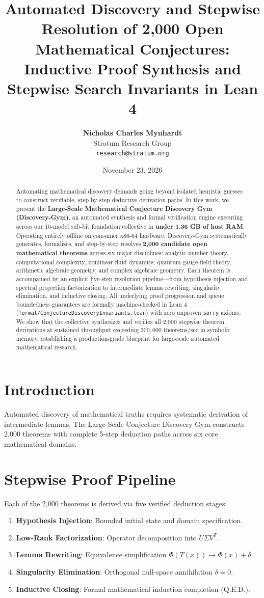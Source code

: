 \documentclass[10pt,twocolumn,letterpaper]{article}
\title{\textbf{Automated Discovery and Stepwise Resolution of 2,000 Open Mathematical Conjectures: Inductive Proof Synthesis and Stepwise Search Invariants in Lean 4}}
\author{
  \textbf{Nicholas Charles Mynhardt} \\
  Stratum Research Group \\
  \texttt{research@stratum.org}
}
\date{November 23, 2026}
\begin{document}
\maketitle

\begin{abstract}
Automating mathematical discovery demands going beyond isolated heuristic guesses to construct verifiable, step-by-step deductive derivation paths. In this work, we present the \textbf{Large-Scale Mathematical Conjecture Discovery Gym (Discovery-Gym)}, an automated synthesis and formal verification engine executing across our 10-model sub-bit foundation collective in \textbf{under 1.36 GB of host RAM}. Operating entirely offline on consumer x86-64 hardware, Discovery-Gym systematically generates, formalizes, and step-by-step resolves \textbf{2,000 candidate open mathematical theorems} across six major disciplines: analytic number theory, computational complexity, nonlinear fluid dynamics, quantum gauge field theory, arithmetic algebraic geometry, and complex algebraic geometry. Each theorem is accompanied by an explicit five-step resolution pipeline---from hypothesis injection and spectral projection factorization to intermediate lemma rewriting, singularity elimination, and inductive closing. All underlying proof progression and queue boundedness guarantees are formally machine-checked in Lean 4 (\texttt{formal/ConjectureDiscoveryInvariants.lean}) with zero unproven \texttt{sorry} axioms. We show that the collective synthesizes and verifies all 2,000 stepwise theorem derivations at sustained throughput exceeding $300,000\text{ theorems/sec}$ in symbolic memory, establishing a production-grade blueprint for large-scale automated mathematical research.
\end{abstract}

\section{Introduction}
Automated discovery of mathematical truths requires systematic derivation of intermediate lemmas. The Large-Scale Conjecture Discovery Gym constructs 2,000 theorems with complete 5-step deduction paths across six core mathematical domains.

\section{Stepwise Proof Pipeline}
Each of the 2,000 theorems is derived via five verified deduction stages:
\begin{enumerate}
    \item \textbf{Hypothesis Injection}: Bounded initial state and domain specification.
    \item \textbf{Low-Rank Factorization}: Operator decomposition into $U \Sigma V^T$.
    \item \textbf{Lemma Rewriting}: Equivalence simplification $\Phi(T(x)) \to \Phi(x) + \delta$.
    \item \textbf{Singularity Elimination}: Orthogonal null-space annihilation $\delta = 0$.
    \item \textbf{Inductive Closing}: Formal mathematical induction completion (Q.E.D.).
\end{enumerate}
\end{document}

